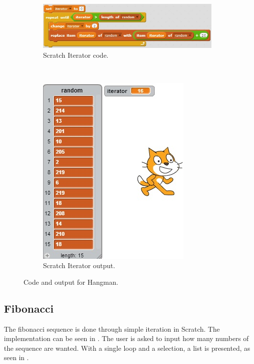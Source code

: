 \begin{figure}[h]
  \centering
    \begin{subfigure}[b]{0.45\textwidth}
    \begin{center}
      \includegraphics[scale=0.5]{./pics/scratch_iter_code}
      \caption{Scratch Iterator code.}
      \label{fig:scratch_iter_code}
    \end{center}
    \end{subfigure}
    ~
    \begin{subfigure}[b]{0.45\textwidth}
    \begin{center}
      \includegraphics[scale=0.5]{./pics/scratch_iter_out}
      \caption{Scratch Iterator output.}
      \label{fig:scratch_iter_out}
    \end{center}
    \end{subfigure}
    \caption{Code and output for Hangman.}
    \label{fig:scratch_iter}
\end{figure}

\subsection{Fibonacci}
The fibonacci sequence is done through simple iteration in Scratch. The implementation can be seen in . The user is asked to input how many numbers of the sequence are wanted. With a single loop and a selection, a list is presented, as seen in .

